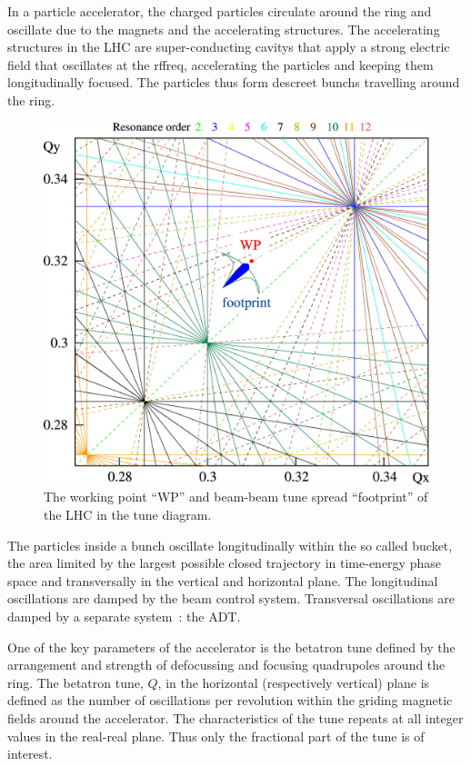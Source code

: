 In a particle accelerator, the charged particles circulate around the
ring and oscillate due to the magnets and the accelerating
structures. The accelerating structures in the \gls{LHC} are
super-conducting \glspl{cavity} that apply a strong electric field
that oscillates at the \gls{rffreq}, accelerating the particles and
keeping them longitudinally focused. The particles thus form descreet
\glspl{bunch} travelling around the ring.

\begin{figure}[H]
\centering
\caption{The working point ``WP'' and beam-beam tune spread ``footprint'' of the LHC in the tune diagram.}
\includegraphics[scale=1.25]{lhc_working_point.jpeg}
\end{figure}

The particles inside a bunch oscillate longitudinally within the so
called bucket, the area limited by the largest possible closed
trajectory in time-energy phase space and transversally in the
vertical and horizontal plane. The longitudinal oscillations are
damped by the beam control system. Transversal oscillations are damped
by a separate system~: the \gls{ADT}\cite{Zhabitsky:1141925,Benews11}.

One of the key parameters of the accelerator is the betatron tune
defined by the arrangement and strength of defocussing and focusing
quadrupoles around the ring. The betatron tune, $Q$, in the horizontal
(respectively vertical) plane is defined as the number of oscillations
per revolution within the griding magnetic fields around the
accelerator. The characteristics of the tune repeats at all integer
values in the real-real plane. Thus only the fractional part of the
tune is of interest.

